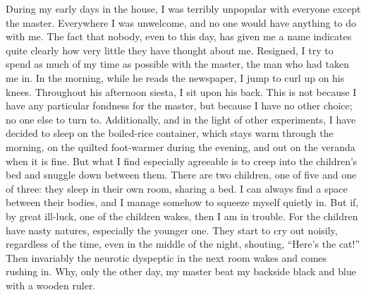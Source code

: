 \documentclass[12pt, openright]{book}
\begin{document}
During my early days in the house, I was terribly unpopular with
everyone except the master. Everywhere I was unwelcome, and no one would
have anything to do with me. The fact that nobody, even to this day, has
given me a name indicates quite clearly how very little they have
thought about me. Resigned, I try to spend as much of my time as
possible with the master, the man who had taken me in. In the morning,
while he reads the newspaper, I jump to curl up on his knees. Throughout
his afternoon siesta, I sit upon his back. This is not because I have
any particular fondness for the master, but because I have no other
choice; no one else to turn to. Additionally, and in the light of other
experiments, I have decided to sleep on the boiled-rice container, which
stays warm through the morning, on the quilted foot-warmer during the
evening, and out on the veranda when it is fine. But what I find
especially agreeable is to creep into the children's bed and snuggle
down between them. There are two children, one of five and one of three:
they sleep in their own room, sharing a bed. I can always find a space
between their bodies, and I manage somehow to squeeze myself quietly in.
But if, by great ill-luck, one of the children wakes, then I am in
trouble. For the children have nasty natures, especially the younger
one. They start to cry out noisily, regardless of the time, even in the
middle of the night, shouting, ``Here's the cat!'' Then invariably the
neurotic dyspeptic in the next room wakes and comes rushing in. Why,
only the other day, my master beat my backside black and blue with a
wooden ruler.
\end{document}

